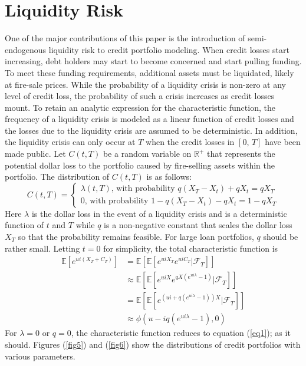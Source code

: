 \documentclass[12pt]{article}
\theoremstyle{definition}
\begin{document}
\section{Liquidity Risk}
One of the major contributions of this paper is the introduction of semi-endogenous liquidity risk to credit portfolio modeling.  When credit losses start increasing, debt holders may start to become concerned and start pulling funding.  To meet these funding requirements, additional assets must be liquidated, likely at fire-sale prices.  While the probability of a liquidity crisis is non-zero at any level of credit loss, the probability of such a crisis increases as credit losses mount.  To retain an analytic expression for the characteristic function, the frequency of a liquidity crisis is modeled as a linear function of credit losses and the losses due to the liquidity crisis are assumed to be deterministic.  In addition, the liquidity crisis can only occur at \(T\) when the credit losses in \([0,\, T]\) have been made public.  Let \(C(t, T)\) be a random variable on \(\mathbb{R}^+\) that represents the potential dollar loss to the portfolio caused by fire-selling assets within the portfolio.  The distribution of \(C(t, T)\) is as follows:
\begin{equation}
C(t, T)=
\begin{cases}
\lambda(t, T),\, \text{with probability } q(X_T-X_t)+qX_t = q X_T \\
0,\,\text{with probability } 1-  q(X_T-X_t)-qX_t=1-qX_T
\end{cases}
\end{equation}
Here \(\lambda\) is the dollar loss in the event of a liquidity crisis and is a deterministic function of \(t\) and \(T\) while \(q\) is a non-negative constant that scales the dollar loss \(X_T\) so that the probability remains feasible.  For large loan portfolios, \(q\) should be rather small.  Letting \(t=0\) for simplicity, the total characteristic function is 
\begin{align}\mathbb{E}\left[e^{ui(X_T+C_T)}\right]&=\mathbb{E}\left[\mathbb{E}\left[e^{uiX_T} e^{uiC_T} | \mathcal{F}_T\right] \right]\\
&\approx \mathbb{E}\left[\mathbb{E}\left[ e^{uiX} e^{qX(e^{ui\lambda }-1)} |\mathcal{F}_T \right]\right]\\
&=\mathbb{E}\left[\mathbb{E}\left[ e^{\left(ui+q(e^{ui\lambda}-1)\right)X}| \mathcal{F}_T \right]\right]\\
&\approx \phi\left(u-iq(e^{ui\lambda }-1), 0\right) \end{align}
For \(\lambda=0\) or \(q=0\), the characteristic function reduces to equation (\ref{eq1}); as it should.  Figures (\ref{fig5}) and (\ref{fig6}) show the distributions of credit portfolios with various parameters.
\end{document}
